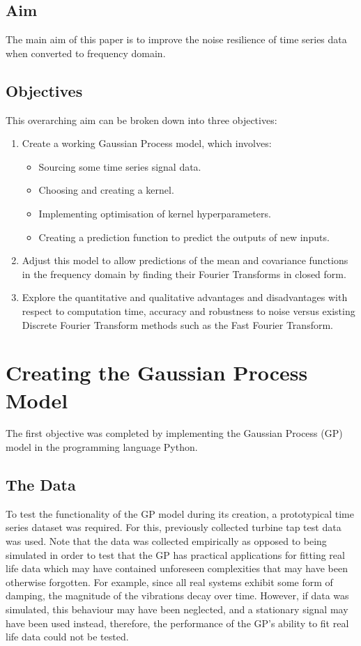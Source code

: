 \documentclass[12pt]{article}
\begin{document}
    \subsection{Aim}
    The main aim of this paper is to improve the noise resilience of time series data when converted to frequency domain.

    \subsection{Objectives}
    This overarching aim can be broken down into three objectives:
        \begin{enumerate}
            \item Create a working Gaussian Process model, which involves:
                \begin{itemize}
                    \item Sourcing some time series signal data.
                    \item Choosing and creating a kernel.
                    \item Implementing optimisation of kernel hyperparameters. \label{item:nll}
                    \item Creating a prediction function to predict the outputs of new inputs. \label{item:predict}
                \end{itemize}
            \item Adjust this model to allow predictions of the mean and covariance functions in the frequency domain by finding their Fourier Transforms in closed form. \label{item:FT}
            \item Explore the quantitative and qualitative advantages and disadvantages with respect to computation time, accuracy and robustness to noise versus existing Discrete Fourier Transform methods such as the Fast Fourier Transform.\label{noise-resilience}
        \end{enumerate}

    \section{Creating the Gaussian Process Model}
    The first objective was completed by implementing the Gaussian Process (GP) model in the programming language Python.
    \subsection{The Data}
    To test the functionality of the GP model during its creation, a prototypical time series dataset was required.
    For this, previously collected turbine tap test data~\cite{MEC326} was used.
    Note that the data was collected empirically as opposed to being simulated in order to test that the GP has practical applications for fitting real life data which may have contained unforeseen complexities that may have been otherwise forgotten.
    For example, since all real systems exhibit some form of damping, the magnitude of the vibrations decay over time.
    However, if data was simulated, this behaviour may have been neglected, and a stationary signal may have been used instead, therefore, the performance of the GP's ability to fit real life data could not be tested.
\end{document}

